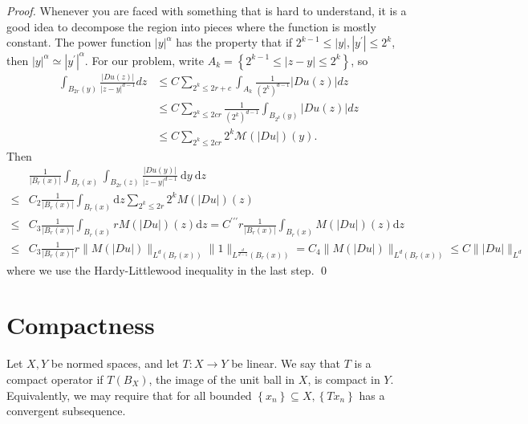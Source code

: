\begin{proof}
    Whenever you are faced with something that is hard to understand, it is a good idea to decompose the region into pieces where the function is mostly constant. The power function $|y|^{\alpha}$ has the property that if $2^{k-1} \leq|y|,\left|y^{\prime}\right| \leq 2^{k}$, then $|y|^{\alpha} \simeq\left|y^{\prime}\right|^{\alpha}$. For our problem, write $A_{k}=\left\{2^{k-1} \leq|z-y| \leq 2^{k}\right\}$, so
$$
\begin{aligned}
\int_{B_{2 r}(y)} \frac{|D u(z)|}{|z-y|^{d-1}} d z & \leq C \sum_{2^{k} \leq 2 r+c} \int_{A_{k}} \frac{1}{\left(2^{k}\right)^{d-1}}|D u(z)| d z \\
& \leq C \sum_{2^{k} \leq 2 c r} \frac{1}{\left(2^{k}\right)^{d-1}} \int_{B_{2^{k}}(y)}|D u(z)| d z \\
& \leq C \sum_{2^{k} \leq 2 c r} 2^{k} \mathcal{M}(|D u|)(y) .
\end{aligned}
$$
Then 
$$
\begin{aligned}
& \frac{1}{\left|B_{r}(x)\right|} \int_{B_{r}(x)} \int_{B_{2 r}(z)} \frac{|D u(y)|}{|z-y|^{d-1}} \mathrm{~d} y \mathrm{~d} z \\
\leq & C_{2} \frac{1}{\left|B_{r}(x)\right|} \int_{B_{r}(x)} \mathrm{d} z \sum_{2^{k} \leq 2 r} 2^{k} M(|D u|)(z) \\
\leq & C_{3} \frac{1}{\left|B_{r}(x)\right|} \int_{B_{r}(x)} r M(|D u|)(z) \mathrm{d} z=C^{\prime \prime \prime} r \frac{1}{\left|B_{r}(x)\right|} \int_{B_{r}(x)} M(|D u|)(z) \mathrm{d} z \\
\leq & C_{3} \frac{1}{\left|B_{r}(x)\right|} r\|M(|D u|)\|_{L^{d}\left(B_{r}(x)\right)}\|1\|_{L^{\frac{d}{d-1}}\left(B_{r}(x)\right)}=C_{4}\|M(|D u|)\|_{L^{d}\left(B_{r}(x)\right)} \leq C\||D u|\|_{L^{d}}
\end{aligned}
$$
where we use the Hardy-Littlewood inequality in the last step.
\qed 
\end{proof}


\newpage
\section{Compactness} 


\begin{definition}
\label{def: compact operator}
Let $X, Y$ be normed spaces, and let $T: X \rightarrow Y$ be linear. We say that $T$ is a compact operator if $T\left(B_{X}\right)$, the image of the unit ball in $X$, is compact in $Y$. Equivalently, we may require that for all bounded $\left\{x_{n}\right\} \subseteq X,\left\{T x_{n}\right\}$ has a convergent subsequence.
\end{definition}

